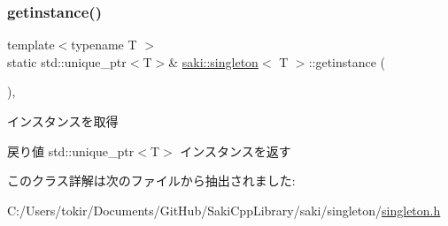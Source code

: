 \subsubsection{\texorpdfstring{getinstance()}{getinstance()}}
{\footnotesize\ttfamily template$<$typename T $>$ \\
static std\+::unique\+\_\+ptr$<$T$>$\& \mbox{\hyperlink{classsaki_1_1singleton}{saki\+::singleton}}$<$ T $>$\+::getinstance (\begin{DoxyParamCaption}{ }\end{DoxyParamCaption})\hspace{0.3cm}{\ttfamily [inline]}, {\ttfamily [static]}}



インスタンスを取得 

\begin{DoxyReturn}{戻り値}
std\+::unique\+\_\+ptr$<$\+T$>$ インスタンスを返す 
\end{DoxyReturn}


このクラス詳解は次のファイルから抽出されました\+:\begin{DoxyCompactItemize}
\item 
C\+:/\+Users/tokir/\+Documents/\+Git\+Hub/\+Saki\+Cpp\+Library/saki/singleton/\mbox{\hyperlink{singleton_2singleton_8h}{singleton.\+h}}\end{DoxyCompactItemize}
